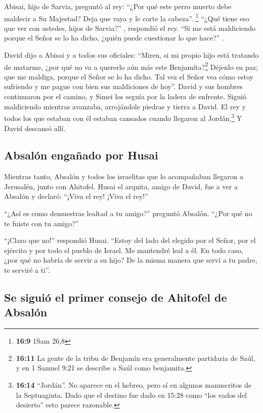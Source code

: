  Abisai, hijo de Sarvia, preguntó al rey: ``¿Por qué este
perro muerto debe maldecir a Su Majestad? Deja que vaya y le corte la
cabeza''. \footnote{\textbf{16:9} 1Sam 26,8}  ``¿Qué
tiene eso que ver con ustedes, hijos de Sarvia?'' , respondió el rey.
``Si me está maldiciendo porque el Señor se lo ha dicho, ¿quién puede
cuestionar lo que hace?'' .

 David dijo a Abisai y a todos sus oficiales: ``Miren, si
mi propio hijo está tratando de matarme, ¿por qué no va a quererlo aún
más este Benjamíta?\footnote{\textbf{16:11} La gente de la tribu de
  Benjamín era generalmente partidaria de Saúl, y en 1 Samuel 9:21 se
  describe a Saúl como benjamita.} Déjenlo en paz; que me maldiga,
porque el Señor se lo ha dicho.  Tal vez el Señor vea
cómo estoy sufriendo y me pague con bien sus maldiciones de hoy''.
 David y sus hombres continuaron por el camino, y Simei
los seguía por la ladera de enfrente. Siguió maldiciendo mientras
avanzaba, arrojándole piedras y tierra a David.  El rey y
todos los que estaban con él estaban cansados cuando llegaron al
Jordán.\footnote{\textbf{16:14} ``Jordán''. No aparece en el hebreo,
  pero sí en algunos manuscritos de la Septuaginta. Dado que el destino
  fue dado en 15:28 como ``los vados del desierto'' esto parece
  razonable.} Y David descansó allí.

\hypertarget{absaluxf3n-engauxf1ado-por-husai}{%
\subsection{Absalón engañado por
Husai}\label{absaluxf3n-engauxf1ado-por-husai}}

 Mientras tanto, Absalón y todos los israelitas que lo
acompañaban llegaron a Jerusalén, junto con Ahitofel. 
Husai el arquita, amigo de David, fue a ver a Absalón y declaró: ``¡Viva
el rey! ¡Viva el rey!''

 ``¿Así es como demuestras lealtad a tu amigo?'' preguntó
Absalón. ``¿Por qué no te fuiste con tu amigo?''

 ``¡Claro que no!'' respondió Husai. ``Estoy del lado del
elegido por el Señor, por el ejército y por todo el pueblo de Israel. Me
mantendré leal a él.  En todo caso, ¿por qué no habría de
servir a su hijo? De la misma manera que serví a tu padre, te serviré a
ti''.

\hypertarget{se-siguiuxf3-el-primer-consejo-de-ahitofel-de-absaluxf3n}{%
\subsection{Se siguió el primer consejo de Ahitofel de
Absalón}\label{se-siguiuxf3-el-primer-consejo-de-ahitofel-de-absaluxf3n}}

